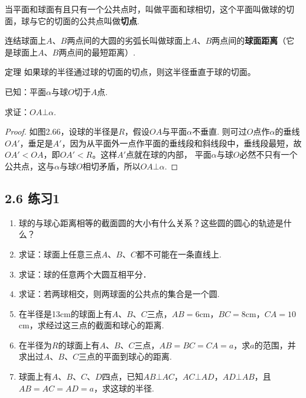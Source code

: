 当平面和球面有且只有一个公共点时，叫做平面和球相切，这个平面叫做球的切面，球与它的切面的公共点叫做\textbf{切点}.

连结球面上$A$、$B$两点间的大圆的劣弧长叫做球面上$A$、$B$两点间的\textbf{球面距离}（它是球面上$A$、$B$两点间的最短距离）.

\begin{thm}
    {定理} 如果球的半径通过球的切面的切点，则这半径垂直于球的切面。
\end{thm}

已知：平面$\alpha$与球$O$切于$A$点.

求证：$OA\bot \alpha$.

\noindent
\begin{minipage}{.6\textwidth}
\begin{proof}
    如图2.66，设球的半径是$R$，假设$OA$与平面$\alpha$不垂直. 则可过$O$点作$\alpha$的垂线$OA'$，垂足是$A'$，因为从平面外一点作平面的垂线段和斜线段中，垂线段最短，故$OA'<OA$，即$OA'<R$。这样$A'$点就在球的内部，
平面$\alpha$与球$O$必然不只有一个公共点，这与$\alpha$与球$O$相切矛盾，所以$OA\bot\alpha$.
\end{proof}
\end{minipage}
\hfill
\begin{minipage}{.38\textwidth}
\centering
{}
\end{minipage}

\subsection*{2.6 练习1}
\begin{enumerate}
\item 球的与球心距离相等的截面圆的大小有什么关系？这些圆的圆心的轨迹是什么？
\item 求证：球面上任意三点$A$、$B$、$C$都不可能在一条直线上.
\item 求证：球的任意两个大圆互相平分．
\item 求证：若两球相交，则两球面的公共点的集合是一个圆.
\item 在半径是13cm的球面上有$A$、$B$、$C$三点，$AB=6$cm，$BC=8$cm，$CA=10$cm，求经过这三点的截面和球心的距离.
\item 在半径为$R$的球面上有$A$、$B$、$C$三点，$AB=BC=CA=a$，求$a$的范围，并求出过$A$、$B$、$C$三点的平面到球心的距离.
\item 球面上有$A$、$B$、$C$、$D$四点，已知$AB\bot AC$，$AC\bot AD$，$AD\bot AB$，且$AB=AC=AD=a$，求这球的半径.
\end{enumerate}

